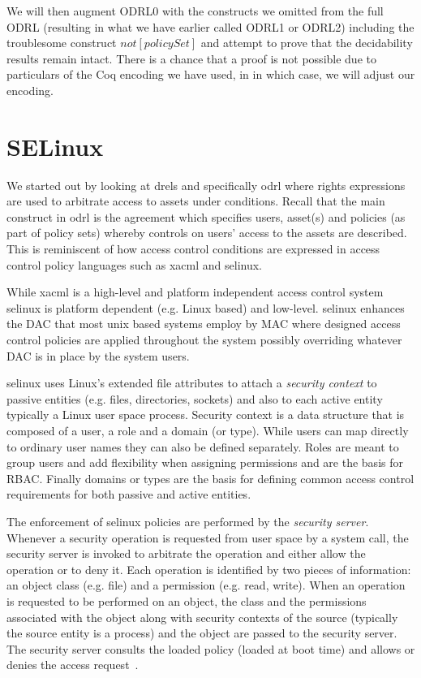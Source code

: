 We will then augment ODRL0 with the constructs we omitted from the full ODRL (resulting in what we have earlier called ODRL1 or ODRL2) including the troublesome construct $not[policySet]$ and attempt to prove that the decidability results remain intact. There is a chance that a proof is not possible due to particulars of the Coq encoding we have used, in in which case, we will adjust our encoding.

\section{SELinux}
 
We started out by looking at \ac{drel}s and specifically \ac{odrl} where rights expressions are used to arbitrate access to assets under conditions. Recall that the main construct in \ac{odrl} is the agreement which specifies users, asset(s) and policies (as part of policy sets) whereby controls on users' access to the assets are described. This is reminiscent of how access control conditions are expressed in access control policy languages such as \ac{xacml} and \ac{selinux}.

While \ac{xacml} is a high-level and platform independent access control system \ac{selinux} is platform dependent (e.g. Linux based) and low-level. \ac{selinux} enhances the \ac{DAC} that most unix based systems employ by \ac{MAC} where designed access control policies are applied throughout the system possibly overriding whatever \ac{DAC} is in place by the system users. 

\ac{selinux} uses Linux's extended file attributes to attach a \emph{security context} to passive entities (e.g. files, directories, sockets) and also to each active entity typically a Linux user space process. Security context is a data structure that is composed of a user, a role and a domain (or type). While users can map directly to ordinary user names they can also be defined separately. Roles are meant to group users and add flexibility when assigning permissions and are the basis for \ac{RBAC}. Finally domains or types are the basis for defining common access control requirements for both passive and active entities. 


The enforcement of \ac{selinux} policies are performed by the \emph{security server}. Whenever a security operation is requested from user space by a system call, the security server is invoked to arbitrate the operation and either allow the operation or to deny it. Each operation is identified by two pieces of information: an object class (e.g. file) and a permission (e.g. read, write). When an operation is requested to be performed on an object, the class and the permissions associated with the object along with security contexts of the source (typically the source entity is a process) and the object are passed to the security server. The security server consults the loaded policy (loaded at boot time) and allows or denies the access request~\cite{Sarna}.

